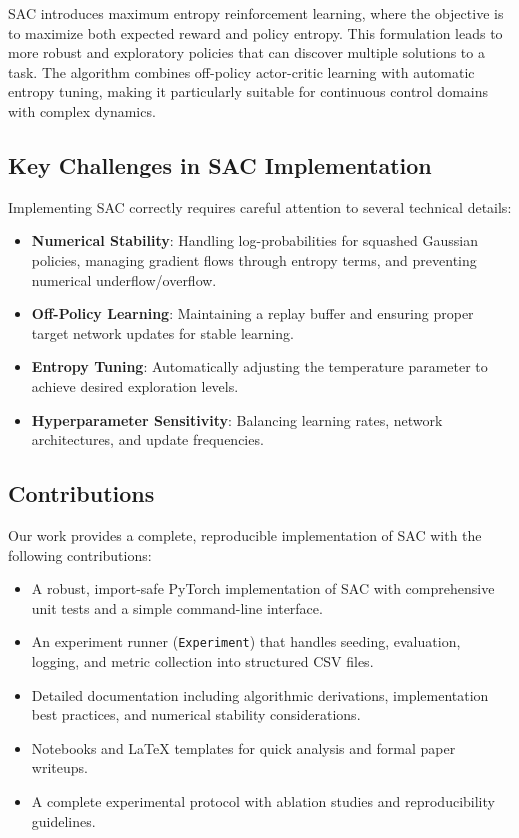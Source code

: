 \documentclass[conference]{IEEEtran}
\begin{document}
SAC introduces maximum entropy reinforcement learning, where the objective is to maximize both expected reward and policy entropy. This formulation leads to more robust and exploratory policies that can discover multiple solutions to a task. The algorithm combines off-policy actor-critic learning with automatic entropy tuning, making it particularly suitable for continuous control domains with complex dynamics.

\subsection{Key Challenges in SAC Implementation}
Implementing SAC correctly requires careful attention to several technical details:
\begin{itemize}
  \item \textbf{Numerical Stability}: Handling log-probabilities for squashed Gaussian policies, managing gradient flows through entropy terms, and preventing numerical underflow/overflow.
  \item \textbf{Off-Policy Learning}: Maintaining a replay buffer and ensuring proper target network updates for stable learning.
  \item \textbf{Entropy Tuning}: Automatically adjusting the temperature parameter to achieve desired exploration levels.
  \item \textbf{Hyperparameter Sensitivity}: Balancing learning rates, network architectures, and update frequencies.
\end{itemize}

\subsection{Contributions}
Our work provides a complete, reproducible implementation of SAC with the following contributions:
\begin{itemize}
  \item A robust, import-safe PyTorch implementation of SAC with comprehensive unit tests and a simple command-line interface.
  \item An experiment runner (\texttt{Experiment}) that handles seeding, evaluation, logging, and metric collection into structured CSV files.
  \item Detailed documentation including algorithmic derivations, implementation best practices, and numerical stability considerations.
  \item Notebooks and LaTeX templates for quick analysis and formal paper writeups.
  \item A complete experimental protocol with ablation studies and reproducibility guidelines.
\end{itemize}
\end{document}
